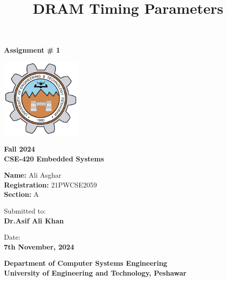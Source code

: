 \documentclass[12pt]{article}
\title{DRAM Timing Parameters}
\date{} %
\begin{document}

\begin{titlepage}
    \centering
    {\Large \textbf{Assignment \# 1}} %
    \vspace{0.2in}
		
		\vspace*{1in}
    \includegraphics[width=0.3\textwidth]{./images/UetLogo.png} %
    \vspace{1in}
    
    {\large \textbf{Fall 2024}  \\ 
						\textbf{CSE-420 Embedded Systems}
						} %
    \vspace{0.5in} 
    
    {\large \textbf{Name:} Ali Asghar \\ 
						\textbf{Registration:} 21PWCSE2059 \\
						\textbf{Section:} A \\
		} %
    \vspace{0.5in}
		
    {\large Submitted to:\\ 
						\textbf{Dr.Asif Ali Khan} \\						
		} %
    \vspace{0.5in}

    {\large Date:\\ 
						\textbf{7th November, 2024} \\						
		} %
    \vspace{0.5in}
		
		{\large \textbf{Department of Computer Systems Engineering}\\ 
						\textbf{University of Engineering and Technology, Peshawar} \\						
		} %
    \vspace{0.5in}
		
    \vfill
\end{titlepage}
\end{document}
